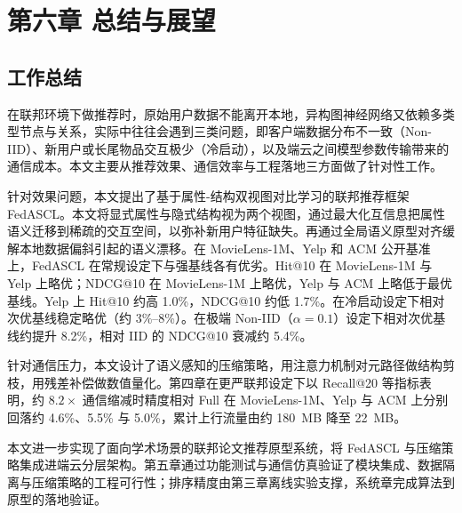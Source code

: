 \newpage
\section{第六章\texorpdfstring{\quad}{} 总结与展望}
\label{chap:conclusion}
\setcounter{section}{6} \setcounter{subsection}{0}

\subsection{工作总结}
\label{sec:summary}
在联邦环境下做推荐时，原始用户数据不能离开本地，异构图神经网络又依赖多类型节点与关系，实际中往往会遇到三类问题，即客户端数据分布不一致（Non-IID）、新用户或长尾物品交互极少（冷启动），以及端云之间模型参数传输带来的通信成本。本文主要从推荐效果、通信效率与工程落地三方面做了针对性工作。

针对效果问题，本文提出了基于属性-结构双视图对比学习的联邦推荐框架 FedASCL。本文将显式属性与隐式结构视为两个视图，通过最大化互信息把属性语义迁移到稀疏的交互空间，以弥补新用户特征缺失。再通过全局语义原型对齐缓解本地数据偏斜引起的语义漂移。在 MovieLens-1M、Yelp 和 ACM 公开基准上，FedASCL 在常规设定下与强基线各有优劣。Hit@10 在 MovieLens-1M 与 Yelp 上略优；NDCG@10 在 MovieLens-1M 上略优，Yelp 与 ACM 上略低于最优基线。Yelp 上 Hit@10 约高 1.0\%，NDCG@10 约低 1.7\%。在冷启动设定下相对次优基线稳定略优（约 3\%--8\%）。在极端 Non-IID（$\alpha=0.1$）设定下相对次优基线约提升 8.2\%，相对 IID 的 NDCG@10 衰减约 5.4\%。

针对通信压力，本文设计了语义感知的压缩策略，用注意力机制对元路径做结构剪枝，用残差补偿做数值量化。第四章在更严联邦设定下以 Recall@20 等指标表明，约 $8.2\times$ 通信缩减时精度相对 Full 在 MovieLens-1M、Yelp 与 ACM 上分别回落约 4.6\%、5.5\% 与 5.0\%，累计上行流量由约 180~MB 降至 22~MB。

本文进一步实现了面向学术场景的联邦论文推荐原型系统，将 FedASCL 与压缩策略集成进端云分层架构。第五章通过功能测试与通信仿真验证了模块集成、数据隔离与压缩策略的工程可行性；排序精度由第三章离线实验支撑，系统章完成算法到原型的落地验证。

